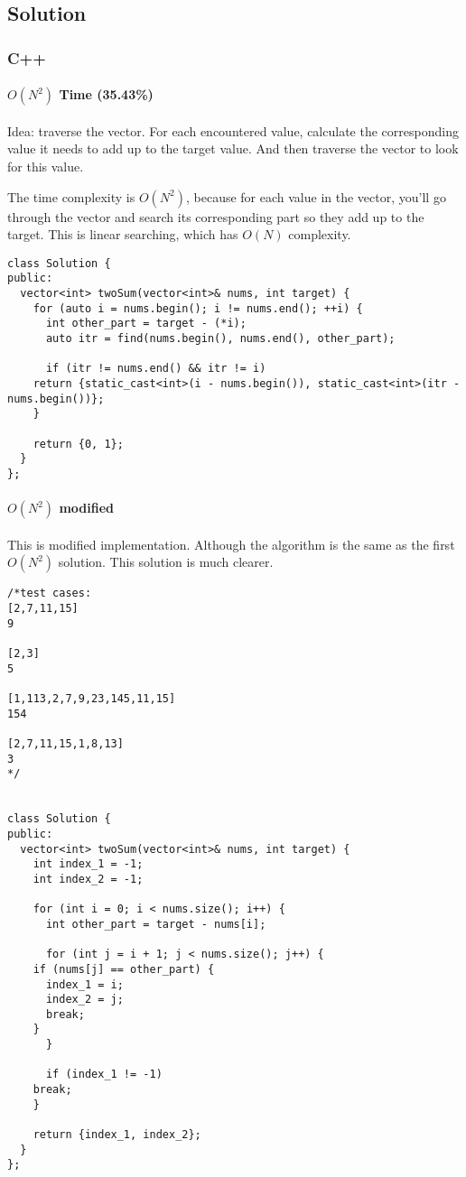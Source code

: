 \documentclass[11pt]{article}
\begin{document}
\subsection{Solution}
\label{sec:orgbb05495}
\subsubsection{C++}
\label{sec:org93478ad}
\paragraph{\(O(N^2)\) Time (35.43\%)}
\label{sec:orgd297227}
Idea: traverse the vector. For each encountered value, calculate the corresponding value it needs to add up to the target value. And then traverse the vector to look for this value.

The time complexity is \(O(N^2)\), because for each value in the vector, you'll go through the vector and search its corresponding part so they add up to the target. This is linear searching, which has \(O(N)\) complexity.
\begin{verbatim}
class Solution {
public:
  vector<int> twoSum(vector<int>& nums, int target) {
    for (auto i = nums.begin(); i != nums.end(); ++i) {
      int other_part = target - (*i);
      auto itr = find(nums.begin(), nums.end(), other_part);

      if (itr != nums.end() && itr != i)
	return {static_cast<int>(i - nums.begin()), static_cast<int>(itr - nums.begin())};
    }

    return {0, 1};
  }
};
\end{verbatim}
\paragraph{\(O(N^2)\) modified}
\label{sec:orga0b1ef4}
This is modified implementation. Although the algorithm is the same as the first \(O(N^2)\) solution. This solution is much clearer.
\begin{verbatim}
/*test cases: 
[2,7,11,15]
9

[2,3]
5

[1,113,2,7,9,23,145,11,15]
154

[2,7,11,15,1,8,13]
3
*/


class Solution {
public:
  vector<int> twoSum(vector<int>& nums, int target) {
    int index_1 = -1;
    int index_2 = -1;

    for (int i = 0; i < nums.size(); i++) {
      int other_part = target - nums[i];

      for (int j = i + 1; j < nums.size(); j++) {
	if (nums[j] == other_part) {
	  index_1 = i;
	  index_2 = j;
	  break;
	}
      }

      if (index_1 != -1)
	break;
    }

    return {index_1, index_2};
  }
};
\end{verbatim}
\end{document}
